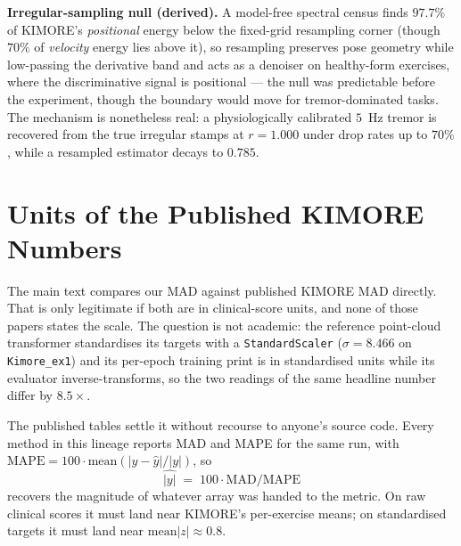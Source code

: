 \documentclass[10pt,twocolumn,letterpaper]{article}
\begin{document}
\textbf{Irregular-sampling null (derived).} A model-free spectral census finds $97.7\%$ of KIMORE's
\emph{positional} energy below the fixed-grid resampling corner (though $70\%$ of \emph{velocity}
energy lies above it), so resampling preserves pose geometry while low-passing the derivative band and
acts as a denoiser on healthy-form exercises, where the discriminative signal is positional --- the null
was predictable before the experiment, though the boundary would move for tremor-dominated tasks. The
mechanism is nonetheless
real: a physiologically calibrated $5$~Hz tremor is recovered from the true irregular stamps at
$r{=}1.000$ under drop rates up to $70\%$, while a resampled estimator decays to $0.785$.

\section{Units of the Published KIMORE Numbers}\label{sec:supp:units}
The main text compares our MAD against published KIMORE MAD directly. That is only legitimate if both
are in clinical-score units, and none of those papers states the scale. The question is not academic:
the reference point-cloud transformer standardises its targets with a \texttt{StandardScaler}
($\sigma\!=\!8.466$ on \texttt{Kimore\_ex1}) and its per-epoch training print is in standardised units
while its evaluator inverse-transforms, so the two readings of the same headline number differ by
$8.5\times$.

The published tables settle it without recourse to anyone's source code. Every method in this lineage
reports MAD and MAPE for the same run, with $\mathrm{MAPE}=100\cdot\mathrm{mean}(|y-\hat y|/|y|)$, so
\begin{equation}
\widehat{|y|}\;=\;100\cdot\mathrm{MAD}/\mathrm{MAPE}
\end{equation}
recovers the magnitude of whatever array was handed to the metric. On raw clinical scores it must land
near KIMORE's per-exercise means; on standardised targets it must land near $\mathrm{mean}|z|\!\approx\!0.8$.
\end{document}
